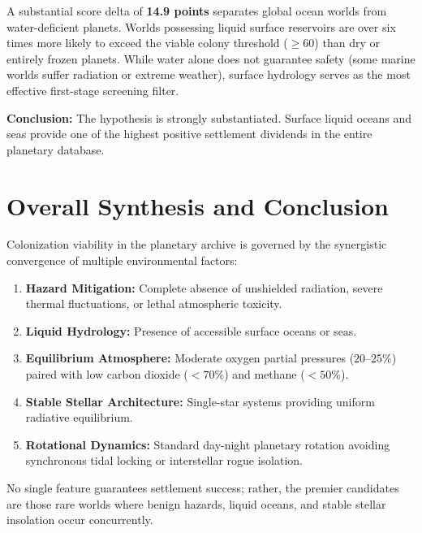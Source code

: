 \documentclass[11pt,a4paper]{article}
\begin{document}
A substantial score delta of \textbf{14.9 points} separates global ocean worlds from water-deficient planets. Worlds possessing liquid surface reservoirs are over six times more likely to exceed the viable colony threshold ($\ge 60$) than dry or entirely frozen planets. While water alone does not guarantee safety (some marine worlds suffer radiation or extreme weather), surface hydrology serves as the most effective first-stage screening filter.

\noindent\textbf{Conclusion:} The hypothesis is strongly substantiated. Surface liquid oceans and seas provide one of the highest positive settlement dividends in the entire planetary database.


\vspace{1em}

\section*{Overall Synthesis and Conclusion}

Colonization viability in the planetary archive is governed by the synergistic convergence of multiple environmental factors:
\begin{enumerate}[noitemsep]
    \item \textbf{Hazard Mitigation:} Complete absence of unshielded radiation, severe thermal fluctuations, or lethal atmospheric toxicity.
    \item \textbf{Liquid Hydrology:} Presence of accessible surface oceans or seas.
    \item \textbf{Equilibrium Atmosphere:} Moderate oxygen partial pressures ($20$--$25\%$) paired with low carbon dioxide ($<70\%$) and methane ($<50\%$).
    \item \textbf{Stable Stellar Architecture:} Single-star systems providing uniform radiative equilibrium.
    \item \textbf{Rotational Dynamics:} Standard day-night planetary rotation avoiding synchronous tidal locking or interstellar rogue isolation.
\end{enumerate}

No single feature guarantees settlement success; rather, the premier candidates are those rare worlds where benign hazards, liquid oceans, and stable stellar insolation occur concurrently.
\end{document}
